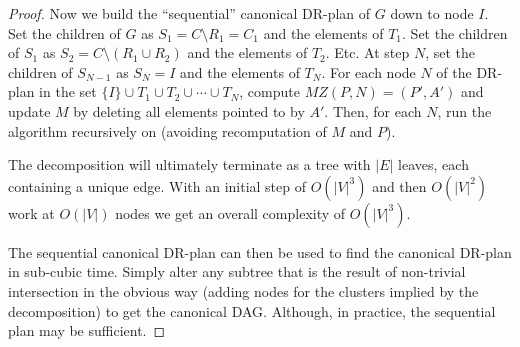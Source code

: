 \begin{proof}

    Now we build the ``sequential'' canonical DR-plan of $G$ down to node $I$.
    Set the children of $G$ as $S_1=C\setminus R_1=C_1$ and the elements of $T_1$. Set the children of $S_1$ as $S_2=C\setminus (R_1\cup R_2)$ and the elements of $T_2$. Etc. At step $N$, set the children of $S_{N-1}$ as $S_N=I$ and the elements of $T_N$.
    For each node $N$ of the DR-plan in the set $\{I\}\cup T_1\cup T_2\cup \cdots\cup T_N$, compute $MZ(P, N)=(P', A')$ and update $M$ by deleting all elements pointed to by $A'$. Then, for each $N$, run the algorithm recursively on (avoiding recomputation of $M$ and $P$).

    The decomposition will ultimately terminate as a tree with $|E|$ leaves, each containing a unique edge. With an initial step of $O(|V|^3)$ and then $O(|V|^2)$ work at $O(|V|)$ nodes we get an overall complexity of $O(|V|^3)$.

    The sequential canonical DR-plan can then be used to find the canonical DR-plan in
    sub-cubic
    time. Simply alter any subtree that is the result of non-trivial intersection in the obvious way (adding nodes for the clusters implied by the decomposition) to get the canonical DAG. Although, in practice, the sequential plan may be sufficient.
\end{proof}






